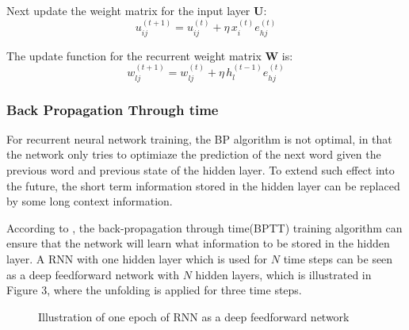 \documentclass[11pt,letterpaper]{article}
\begin{document}
Next update the weight matrix for the input layer $\mathbf{U}$:
\begin{equation}
u_{ij}^{(t+1)} = u_{ij}^{(t)} + \eta \, x_i^{(t)} e_{hj}^{(t)}
\end{equation}

The update function for the recurrent weight matrix $\mathbf{W}$ is:
\begin{equation}
w_{lj}^{(t+1)} = w_{lj}^{(t)} + \eta \, h_l^{(t-1)} e_{hj}^{(t)}
\end{equation}

\subsubsection{Back Propagation Through time}
For recurrent neural network training, the BP algorithm is not optimal, in that the network only tries to optimiaze the prediction of the next word given the previous word and previous state of the hidden layer. To extend such effect into the future, the short term information stored in the hidden layer can be replaced by some long context information.

According to \cite{bp}, the back-propagation through time(BPTT) training algorithm can ensure that the network will learn what information to be stored in the hidden layer. A RNN with one hidden layer which is used for $N$ time steps can be seen as a deep feedforward network with $N$ hidden layers, which is illustrated in Figure 3, where the unfolding is applied for three time steps.

\begin{figure}[H]
	\begin{center}
	\end{center}
	\caption{Illustration of one epoch of RNN as a deep feedforward network}
\end{figure}
\end{document}
